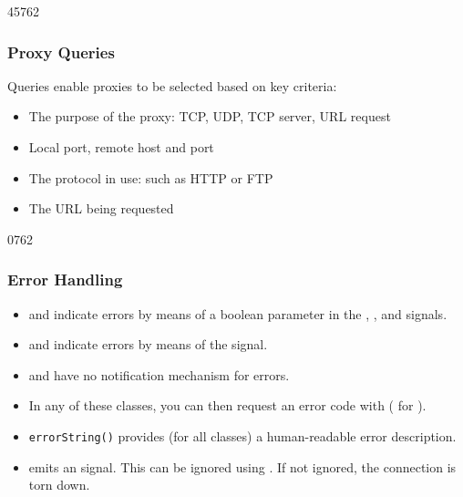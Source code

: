 \begin{slide}{45762}
\frametitle{Proxy Queries}
Queries enable proxies to be selected based on key criteria:
\begin{itemize}
  \item The purpose of the proxy: TCP, UDP, TCP server, URL request
  \item Local port, remote host and port
  \item The protocol in use: such as HTTP or FTP
  \item The URL being requested
\end{itemize}
\end{slide}

\begin{slide}[fragile]{0762}
\frametitle{Error Handling}
  \begin{itemize}
      \item {} and  indicate errors by means of a
        boolean parameter in the ,
        , and 
        signals.

  \item {} and  indicate errors
        by means of the  signal.
    \item {} and  have no notification mechanism for
        errors.
    \item In any of these classes, you can then request an error code
        with  ( for
        ).
    \item \texttt{errorString()} provides (for all
        classes) a human-readable error description.
      \item {} emits an 
        signal. This can be ignored using
        . If not ignored, the
        connection is torn down.
  \end{itemize}
\end{slide}

